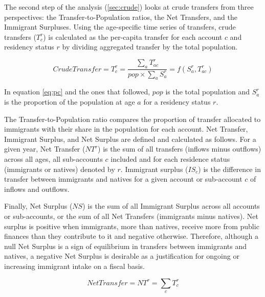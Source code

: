 \vspace{0.7em}\par
The second step of the analysis (\autoref{sec:crude}) looks at crude transfers from three perspectives: the Transfer-to-Population ratios, the Net Transfers, and the Immigrant Surpluses.
Using the age-specific time series of transfers, crude transfers (\(T^{r}_c \)) is calculated as the per-capita transfer for each account \(c \) and residency status \(r\) by dividing aggregated transfer by the total population.

\begin{equation}\label{eq:pc}
  Crude Transfer=T^{r}_c= \frac{\displaystyle\sum_{a}T^{r}_{ac} }{ pop \times \displaystyle\sum_{a} S^{r}_a}=f(S^{r}_a, T^{r}_{ac})
\end{equation}

In equation \eqref{eq:pc} and the ones that followed, \(pop\) is the total population and \(S^{r}_a\) is the proportion of the population at age \(a\) for a residency status \(r\).

\vspace{0.7em}\par
The Transfer-to-Population ratio compares the proportion of transfer allocated to immigrants with their share in the population for each account.
Net Transfer, Immigrant Surplus, and Net Surplus are defined and calculated as follows.
For a given year, Net Transfer (\(NT^{r}\)) is the sum of all transfers (inflows minus outflows) across all ages, all sub-accounts \(c \) included and for each residence status (immigrants or natives) denoted by \(r \).
Immigrant surplus (\(IS_{c}\)) is the difference in transfer between immigrants and natives for a given account or sub-account \(c \) of inflows and outflows.

\vspace{0.7em}\par
Finally, Net Surplus (\( NS \)) is the sum of all Immigrant Surplus across all accounts or sub-accounts, or the sum of all Net Transfers (immigrants minus natives).
Net surplus is positive when immigrants, more than natives, receive more from public finances than they contribute to it and negative otherwise.
Therefore, although a null Net Surplus is a sign of equilibrium in transfers between immigrants and natives, a negative Net Surplus is desirable as a justification for ongoing or increasing immigrant intake on a fiscal basis.

\begin{equation}\label{eq:nt}
  Net Transfer=NT^{r}= \displaystyle\sum_{c}T^{r}_{c}
\end{equation}

